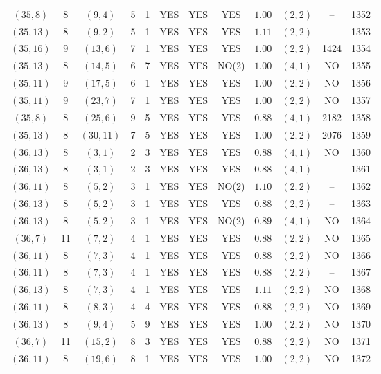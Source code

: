 \begin{longtable}{|c|c|c|c|c|c|c|c|c|c|c|c|}
$(35,8)$ & 8 & $(9,4)$ & 5 & 1 & YES & YES & YES & $1.00$ & $(2,2)$ & -- & 1352\\
$(35,13)$ & 8 & $(9,2)$ & 5 & 1 & YES & YES & YES & $1.11$ & $(2,2)$ & -- & 1353\\
$(35,16)$ & 9 & $(13,6)$ & 7 & 1 & YES & YES & YES & $1.00$ & $(2,2)$ & 1424 & 1354\\
$(35,13)$ & 8 & $(14,5)$ & 6 & 7 & YES & YES & NO(2) & $1.00$ & $(4,1)$ & NO & 1355\\
$(35,11)$ & 9 & $(17,5)$ & 6 & 1 & YES & YES & YES & $1.00$ & $(2,2)$ & NO & 1356\\
$(35,11)$ & 9 & $(23,7)$ & 7 & 1 & YES & YES & YES & $1.00$ & $(2,2)$ & NO & 1357\\
$(35,8)$ & 8 & $(25,6)$ & 9 & 5 & YES & YES & YES & $0.88$ & $(4,1)$ & 2182 & 1358\\
$(35,13)$ & 8 & $(30,11)$ & 7 & 5 & YES & YES & YES & $1.00$ & $(2,2)$ & 2076 & 1359\\
$(36,13)$ & 8 & $(3,1)$ & 2 & 3 & YES & YES & YES & $0.88$ & $(4,1)$ & NO & 1360\\
$(36,13)$ & 8 & $(3,1)$ & 2 & 3 & YES & YES & YES & $0.88$ & $(4,1)$ & -- & 1361\\
$(36,11)$ & 8 & $(5,2)$ & 3 & 1 & YES & YES & NO(2) & $1.10$ & $(2,2)$ & -- & 1362\\
$(36,13)$ & 8 & $(5,2)$ & 3 & 1 & YES & YES & YES & $0.88$ & $(2,2)$ & -- & 1363\\
$(36,13)$ & 8 & $(5,2)$ & 3 & 1 & YES & YES & NO(2) & $0.89$ & $(4,1)$ & NO & 1364\\
$(36,7)$ & 11 & $(7,2)$ & 4 & 1 & YES & YES & YES & $0.88$ & $(2,2)$ & NO & 1365\\
$(36,11)$ & 8 & $(7,3)$ & 4 & 1 & YES & YES & YES & $0.88$ & $(2,2)$ & NO & 1366\\
$(36,11)$ & 8 & $(7,3)$ & 4 & 1 & YES & YES & YES & $0.88$ & $(2,2)$ & -- & 1367\\
$(36,13)$ & 8 & $(7,3)$ & 4 & 1 & YES & YES & YES & $1.11$ & $(2,2)$ & NO & 1368\\
$(36,11)$ & 8 & $(8,3)$ & 4 & 4 & YES & YES & YES & $0.88$ & $(2,2)$ & NO & 1369\\
$(36,13)$ & 8 & $(9,4)$ & 5 & 9 & YES & YES & YES & $1.00$ & $(2,2)$ & NO & 1370\\
$(36,7)$ & 11 & $(15,2)$ & 8 & 3 & YES & YES & YES & $0.88$ & $(2,2)$ & NO & 1371\\
$(36,11)$ & 8 & $(19,6)$ & 8 & 1 & YES & YES & YES & $1.00$ & $(2,2)$ & NO & 1372\\

\end{longtable}
